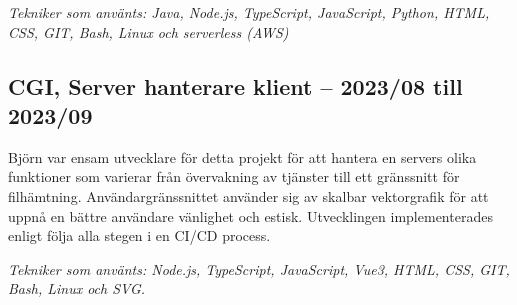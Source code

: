 \documentclass{article}
\begin{document}
\begin{minipage}[t]{0.7\textwidth}
\vspace{5pt}\textit{Tekniker som använts: Java, Node.js, TypeScript, JavaScript, Python, HTML, CSS, GIT, Bash, Linux och serverless (AWS)}

\vspace{15pt} %
\subsection*{\textcolor{colorTitelErfarenhet}{CGI, Server hanterare klient – 2023/08 till 2023/09}}
Björn var ensam utvecklare för detta projekt för att hantera en servers olika funktioner som 
varierar från övervakning av tjänster till ett gränssnitt för filhämtning. Användargränssnittet 
använder sig av skalbar vektorgrafik för att uppnå en bättre användare vänlighet och estisk. 
Utvecklingen implementerades enligt följa alla stegen i en CI/CD process. 

\vspace{5pt}\textit{Tekniker som använts: Node.js, TypeScript, JavaScript, Vue3, HTML, CSS, GIT, Bash, Linux och SVG.}


\end{minipage}%
\hfill
\end{document}
